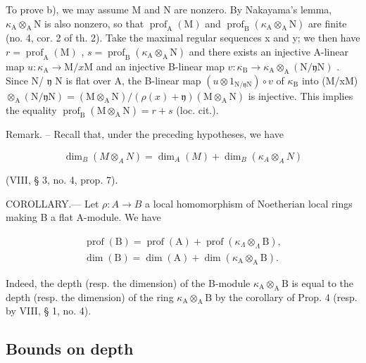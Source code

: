 To prove b), we may assume M and N are nonzero. By Nakayama's lemma, \(\kappa_{\mathrm{A}} \otimes_{\mathrm{A}} \mathrm{N}\) is also nonzero, so that \(\operatorname{prof}_{\mathrm{A}}(\mathrm{M})\) and \(\operatorname{prof}_{\mathrm{B}}(\kappa_{\mathrm{A}} \otimes_{\mathrm{A}} \mathrm{N})\) are finite (no. 4, cor. 2 of th. 2). Take the maximal regular sequences x and y; we then have \(r = \operatorname{prof}_{\mathrm{A}}(\mathrm{M})\) , \(s = \operatorname{prof}_{\mathrm{B}}(\kappa_{\mathrm{A}} \otimes_{\mathrm{A}} \mathrm{N})\) and there exists an injective A-linear map \(u: \kappa_{\mathrm{A}} \to \mathrm{M} / x \mathrm{M}\) and an injective B-linear map \(v: \kappa_{\mathrm{B}} \to \kappa_{\mathrm{A}} \otimes_{\mathrm{A}} (\mathrm{N} / \mathfrak{y} \mathrm{N})\) . Since N/ \(\mathfrak{y}\) N is flat over A, the B-linear map \((u \otimes 1_{\mathrm{N} / \mathfrak{y} \mathrm{N}}) \circ v\) of \(\kappa_{\mathrm{B}}\) into (M/xM) \(\otimes_{\mathrm{A}} (\mathrm{N} / \mathfrak{y} \mathrm{N}) = (\mathrm{M} \otimes_{\mathrm{A}} \mathrm{N}) / (\rho(x) + \mathfrak{y})(\mathrm{M} \otimes_{\mathrm{A}} \mathrm{N})\) is injective. This implies the equality \(\operatorname{prof}_{\mathrm{B}}(\mathrm{M} \otimes_{\mathrm{A}} \mathrm{N}) = r + s\) (loc. cit.).

Remark. -- Recall that, under the preceding hypotheses, we have

\[
\dim_ {B} (M \otimes_ {A} N) = \dim_ {A} (M) + \dim_ {B} (\kappa_ {A} \otimes_ {A} N)
\]

(VIII, § 3, no. 4, prop. 7).

COROLLARY.--- Let \(\rho: A \to B\) a local homomorphism of Noetherian local rings making B a flat A-module. We have

\[
\begin{array}{l} \operatorname{prof} (\mathrm{B}) = \operatorname{prof} (\mathrm{A}) + \operatorname{prof} \left(\kappa_ {\Lambda} \otimes_ {\Lambda} \mathrm{B}\right), \\ \dim (\mathrm{B}) = \dim (\mathrm{A}) + \dim \left(\kappa_ {\mathrm{A}} \otimes_ {\mathrm{A}} \mathrm{B}\right). \end{array}
\]

Indeed, the depth (resp. the dimension) of the B-module \(\kappa_{\mathrm{A}}\otimes_{\mathrm{A}}\mathrm{B}\) is equal to the depth (resp. the dimension) of the ring \(\kappa_{\mathrm{A}}\otimes_{\mathrm{A}}\mathrm{B}\) by the corollary of Prop. 4 (resp. by VIII, § 1, no. 4).

\subsection{Bounds on depth}

